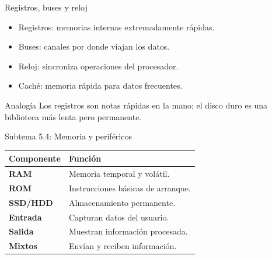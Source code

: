 \documentclass[10pt,aspectratio=169]{beamer}
\begin{document}
	
	\begin{frame}{Registros, buses y reloj}
		
		\small
		
		\begin{itemize}
			\item Registros: memorias internas extremadamente rápidas.
			\item Buses: canales por donde viajan los datos.
			\item Reloj: sincroniza operaciones del procesador.
			\item Caché: memoria rápida para datos frecuentes.
		\end{itemize}
		
		\begin{block}{Analogía}
			Los registros son notas rápidas en la mano; el disco duro es una biblioteca más lenta pero permanente.
		\end{block}
		
	\end{frame}
	
	
	\begin{frame}{Subtema 5.4: Memoria y periféricos}
		
		\small
		
		\begin{center}
			
			\begin{tabular}{>{\bfseries}p{3cm} p{8cm}}
				
				\toprule
				
				Componente & Función \\
				
				\midrule
				
				RAM & Memoria temporal y volátil. \\
				
				ROM & Instrucciones básicas de arranque. \\
				
				SSD/HDD & Almacenamiento permanente. \\
				
				Entrada & Capturan datos del usuario. \\
				
				Salida & Muestran información procesada. \\
				
				Mixtos & Envían y reciben información. \\
				
				\bottomrule
				
			\end{tabular}
			
		\end{center}
		
	\end{frame}
	
\end{document}
